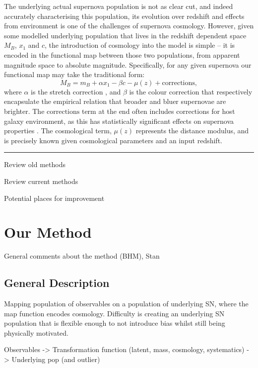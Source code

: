 \documentclass[a4paper,fleqn,usenatbib]{mnras}
\begin{document}
The underlying actual supernova population is not as clear cut, and indeed accurately characterising this population, its evolution over redshift and effects from environment is one of the challenges of supernova cosmology. However, given some modelled underlying population that lives in the redshift dependent space $M_B$, $x_1$ and $c$, the introduction of cosmology into the model is simple -- it is encoded in the functional map between those two populations, from apparent magnitude space to absolute magnitude. Specifically, for any given supernova our functional map may take the traditional form:
\begin{equation}
M_B = m_B + \alpha x_1 - \beta c - \mu(z) + \text{corrections},
\end{equation}
where $\alpha$ is the stretch correction \citep{Phillips1993}, and $\beta$ is the colour correction \citep{Tripp1998} that respectively encapsulate the empirical relation that broader and bluer supernovae are brighter. The $\text{corrections}$ term at the end often includes corrections for host galaxy environment, as this has statistically significant effects on supernova properties \citep{Kelly2010,Sullivan2010,Rigault2013,Uddin2017}. The cosmological term, $\mu(z)$ represents the distance modulus, and is precisely known given cosmological parameters and an input redshift.

\rule{\linewidth}{1pt}
Review old methods

Review current methods

Potential places for improvement

\section{Our Method}
\label{sec:method}

General comments about the method (BHM), Stan

\subsection{General Description}

Mapping population of observables on a population of underlying SN, where the map function encodes
cosmology. Difficulty is creating an underlying SN population that is flexible enough to not introduce bias whilst still being physically motivated. 


Observables -> Transformation function (latent, mass, cosmology, systematics) -> Underlying pop (and outlier)
\end{document}
